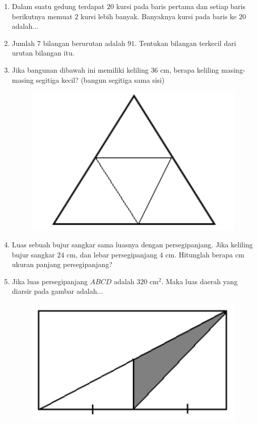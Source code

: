 \documentclass[11pt]{scrartcl}
\begin{document}
\begin{enumerate}
\item Dalam suatu gedung terdapat $20$ kursi pada baris pertama dan setiap baris berikutnya memuat $2$ kursi lebih banyak. Banyaknya kursi pada baris ke $20$ adalah...
\item Jumlah $7$ bilangan berurutan adalah $91$. Tentukan bilangan terkecil dari urutan bilangan itu.
\item Jika bangunan dibawah ini memiliki keliling $36$ cm, berapa keliling masing- masing segitiga kecil? (bangun segitiga sama sisi)
\begin{figure}[h]
    \centering
    \includegraphics[scale=0.3]{Test For Pelatihan/TryOut OSN SD/segitigaSamaSisi.png}
    \label{fig:enter-label}
\end{figure}
\item Luas sebuah bujur sangkar sama luasnya dengan persegipanjang. Jika keliling bujur sangkar $24$ cm, dan lebar persegipanjang $4$ cm. Hitunglah berapa cm ukuran panjang persegipanjang?
\item Jika luas persegipanjang $ABCD$ adalah $320$ cm$^2$. Maka luas daerah yang diarsir pada gambar adalah...
\begin{figure}[h]
    \centering
    \includegraphics[scale=0.3]{Test For Pelatihan/TryOut OSN SD/persegiPanjangDiarsir.png}

\end{figure}
\end{enumerate}
\end{document}
